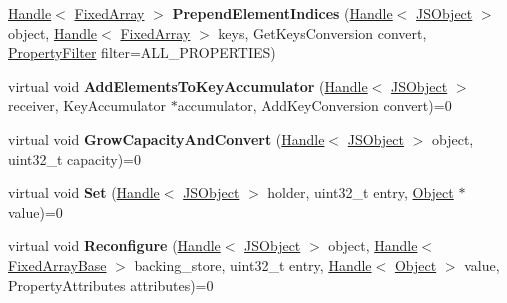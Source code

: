 \begin{DoxyCompactItemize}
\item 
\hyperlink{classv8_1_1internal_1_1_handle}{Handle}$<$ \hyperlink{classv8_1_1internal_1_1_fixed_array}{Fixed\+Array} $>$ {\bfseries Prepend\+Element\+Indices} (\hyperlink{classv8_1_1internal_1_1_handle}{Handle}$<$ \hyperlink{classv8_1_1internal_1_1_j_s_object}{J\+S\+Object} $>$ object, \hyperlink{classv8_1_1internal_1_1_handle}{Handle}$<$ \hyperlink{classv8_1_1internal_1_1_fixed_array}{Fixed\+Array} $>$ keys, Get\+Keys\+Conversion convert, \hyperlink{namespacev8_afbf02b6b1152a3e25d7bde90798209ac}{Property\+Filter} filter=A\+L\+L\+\_\+\+P\+R\+O\+P\+E\+R\+T\+I\+ES)\hypertarget{classv8_1_1internal_1_1_elements_accessor_aff9e69c45a09e009fa73946a8fb6f496}{}\label{classv8_1_1internal_1_1_elements_accessor_aff9e69c45a09e009fa73946a8fb6f496}

\item 
virtual void {\bfseries Add\+Elements\+To\+Key\+Accumulator} (\hyperlink{classv8_1_1internal_1_1_handle}{Handle}$<$ \hyperlink{classv8_1_1internal_1_1_j_s_object}{J\+S\+Object} $>$ receiver, Key\+Accumulator $\ast$accumulator, Add\+Key\+Conversion convert)=0\hypertarget{classv8_1_1internal_1_1_elements_accessor_ac195aeda41125e5d870ae9e6dfa2ee2b}{}\label{classv8_1_1internal_1_1_elements_accessor_ac195aeda41125e5d870ae9e6dfa2ee2b}

\item 
virtual void {\bfseries Grow\+Capacity\+And\+Convert} (\hyperlink{classv8_1_1internal_1_1_handle}{Handle}$<$ \hyperlink{classv8_1_1internal_1_1_j_s_object}{J\+S\+Object} $>$ object, uint32\+\_\+t capacity)=0\hypertarget{classv8_1_1internal_1_1_elements_accessor_ac09aad01025323a4348186c0e99f2e90}{}\label{classv8_1_1internal_1_1_elements_accessor_ac09aad01025323a4348186c0e99f2e90}

\item 
virtual void {\bfseries Set} (\hyperlink{classv8_1_1internal_1_1_handle}{Handle}$<$ \hyperlink{classv8_1_1internal_1_1_j_s_object}{J\+S\+Object} $>$ holder, uint32\+\_\+t entry, \hyperlink{classv8_1_1internal_1_1_object}{Object} $\ast$value)=0\hypertarget{classv8_1_1internal_1_1_elements_accessor_af5f61070137e520a0f03de5dca6ccc42}{}\label{classv8_1_1internal_1_1_elements_accessor_af5f61070137e520a0f03de5dca6ccc42}

\item 
virtual void {\bfseries Reconfigure} (\hyperlink{classv8_1_1internal_1_1_handle}{Handle}$<$ \hyperlink{classv8_1_1internal_1_1_j_s_object}{J\+S\+Object} $>$ object, \hyperlink{classv8_1_1internal_1_1_handle}{Handle}$<$ \hyperlink{classv8_1_1internal_1_1_fixed_array_base}{Fixed\+Array\+Base} $>$ backing\+\_\+store, uint32\+\_\+t entry, \hyperlink{classv8_1_1internal_1_1_handle}{Handle}$<$ \hyperlink{classv8_1_1internal_1_1_object}{Object} $>$ value, Property\+Attributes attributes)=0\hypertarget{classv8_1_1internal_1_1_elements_accessor_a28bc83b75e7112aed2df0e1cc78330f9}{}\label{classv8_1_1internal_1_1_elements_accessor_a28bc83b75e7112aed2df0e1cc78330f9}


\end{DoxyCompactItemize}
